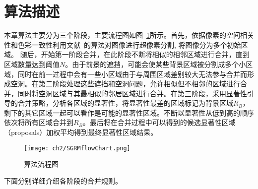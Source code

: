 \section{算法描述}
\label{sec:algorithm}
本章算法主要分为三个阶段，主要流程图如图~\ref{fig:algflow}所示。首先，依据像素的空间相关性和色彩一致性利用文献~的算法对图像进行超像素分割, 将图像分为多个初始区域。 随后，开始第一阶段合并，在此阶段不断将相似的相邻区域进行合并，直到区域数量达到阈值$N$。由于前景的遮挡，可能会使某些背景区域被分割成多个小区域，同时在前一过程中会有一些小区域由于与周围区域差别较大无法参与合并而形成空洞。在第二阶段处理这些遮挡和空洞问题，允许相似但不相邻的区域进行合并，同时将空洞区域与其最相似的邻居区域进行合并。在第三阶段，采用显著性引导的合并策略，分析各区域的显著性，将显著性最差的区域标记为背景区域$R_{B}$，剩下的其它区域一起可以看作是可能的显著性区域。不断以显著性从低到高的顺序依次将所有区域合并到$R_{B}$。最后将在合并过程中可以得到的候选显著性区域（proposals）加权平均得到最终显著性区域结果。\par
\begin{figure}[htb]
  \centering%
      {\texttt{[image: ch2/SGRMflowChart.png]}}

  \caption{算法流程图}
  \label{fig:algflow}
\end{figure}

\par
下面分别详细介绍各阶段的合并规则。

